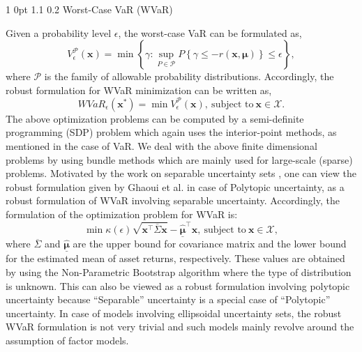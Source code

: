 \documentclass[12pt]{article}
\makeatletter
\numberwithin{equation}{section}
\renewcommand{\subsection}{
  \@startsection
  {subsection}%
  {1}%
  {0pt}%
  {1.1\baselineskip}%
  {0.2\baselineskip}%
  {\sc \centering}%
}
\makeatother
\begin{document}
\subsection{Worst-Case VaR (WVaR)}

Given a probability level $\epsilon$, the worst-case VaR can be formulated as,
\begin{equation}
V_{\epsilon}^{\mathcal{P}}(\mathbf{x})=\min\left\{\gamma: \sup_{P \in \mathcal{P}} P\left\{\gamma \leq -r(\mathbf{x},\boldsymbol{\mu})\right\}
\leq \epsilon \right\},
\label{fig:wc_var_basic}
\end{equation}
where $\mathcal{P}$ is the family of allowable probability distributions. Accordingly, the robust formulation for WVaR minimization can be written as,
\begin{equation}
WVaR_{\epsilon}(\mathbf{x^{*}})=\min V_{\epsilon}^{\mathcal{P}}(\mathbf{x}),~\text{subject to}~\mathbf{x} \in \mathcal{X}.
\label{fig:wc_var_general}
\end{equation}
The above optimization problems can be computed by a semi-definite programming (SDP) problem which again uses the interior-point methods, as mentioned in the case of VaR. We deal with the above finite dimensional problems by using bundle methods which are mainly used for large-scale (sparse) problems. Motivated by the work on separable uncertainty sets \cite{Tutuncu}, one can view the robust formulation given by Ghaoui et al. \cite{Ghaoui03} in case of Polytopic uncertainty, as a robust formulation of WVaR involving separable uncertainty.
Accordingly, the formulation of the optimization problem for WVaR is:
\begin{equation}
\min \kappa(\epsilon)\sqrt{\mathbf{x}^{\top}\overline{\Sigma}\mathbf{x}}-\underline{\hat{\boldsymbol{\mu}}}^{\top}\mathbf{x},~\text{subject to}~
\mathbf{x} \in \mathcal{X},
\label{fig:var_poly}
\end{equation}
where $\overline{\Sigma}$ and $\underline{\hat{\boldsymbol{\mu}}}$ are the upper bound for covariance matrix and the lower bound for the
estimated mean of asset returns, respectively. These values are obtained by using the Non-Parametric Bootstrap algorithm where the type of distribution is unknown. This can also be viewed as a robust formulation involving polytopic uncertainty because ``Separable'' uncertainty is a special case of ``Polytopic'' uncertainty. In case of models involving ellipsoidal uncertainty sets, the robust WVaR formulation is not very trivial and such models mainly revolve around the
assumption of factor models.
\end{document}
